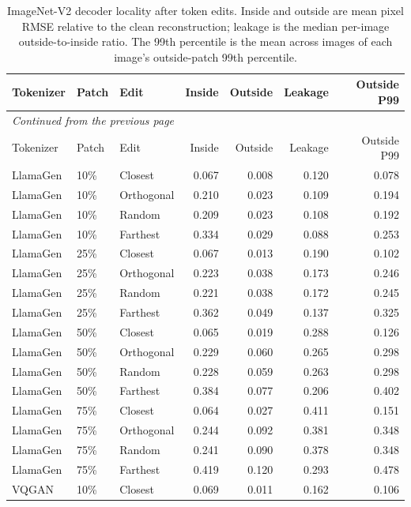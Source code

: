 \begingroup
\small
\setlength{\tabcolsep}{4pt}
\begin{longtable}{lllrrrr}
\caption[ImageNet-V2 decoder locality after token edits]{ImageNet-V2 decoder locality after token edits. Inside and outside are mean pixel RMSE relative to the clean reconstruction; leakage is the median per-image outside-to-inside ratio. The 99th percentile is the mean across images of each image's outside-patch 99th percentile.}\label{tab:app_imagenetv2_locality}\\
\hline
Tokenizer & Patch & Edit & Inside & Outside & Leakage & Outside P99 \\ \hline
\endfirsthead
\multicolumn{7}{l}{\small\itshape Continued from the previous page}\\
\hline
Tokenizer & Patch & Edit & Inside & Outside & Leakage & Outside P99 \\ \hline
\endhead
\hline
\endfoot
LlamaGen & 10\% & Closest & 0.067 & 0.008 & 0.120 & 0.078 \\
LlamaGen & 10\% & Orthogonal & 0.210 & 0.023 & 0.109 & 0.194 \\
LlamaGen & 10\% & Random & 0.209 & 0.023 & 0.108 & 0.192 \\
LlamaGen & 10\% & Farthest & 0.334 & 0.029 & 0.088 & 0.253 \\
LlamaGen & 25\% & Closest & 0.067 & 0.013 & 0.190 & 0.102 \\
LlamaGen & 25\% & Orthogonal & 0.223 & 0.038 & 0.173 & 0.246 \\
LlamaGen & 25\% & Random & 0.221 & 0.038 & 0.172 & 0.245 \\
LlamaGen & 25\% & Farthest & 0.362 & 0.049 & 0.137 & 0.325 \\
LlamaGen & 50\% & Closest & 0.065 & 0.019 & 0.288 & 0.126 \\
LlamaGen & 50\% & Orthogonal & 0.229 & 0.060 & 0.265 & 0.298 \\
LlamaGen & 50\% & Random & 0.228 & 0.059 & 0.263 & 0.298 \\
LlamaGen & 50\% & Farthest & 0.384 & 0.077 & 0.206 & 0.402 \\
LlamaGen & 75\% & Closest & 0.064 & 0.027 & 0.411 & 0.151 \\
LlamaGen & 75\% & Orthogonal & 0.244 & 0.092 & 0.381 & 0.348 \\
LlamaGen & 75\% & Random & 0.241 & 0.090 & 0.378 & 0.348 \\
LlamaGen & 75\% & Farthest & 0.419 & 0.120 & 0.293 & 0.478 \\
VQGAN & 10\% & Closest & 0.069 & 0.011 & 0.162 & 0.106 \\

\end{longtable}

